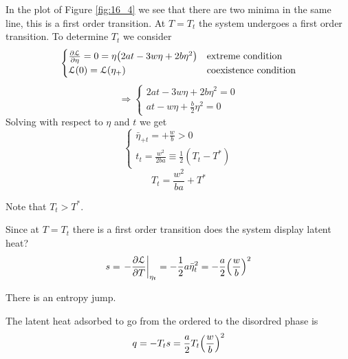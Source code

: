 \documentclass[../main/main.tex]{subfiles}
\begin{document}
\begin{itemize}
\begin{itemize}
In the plot of Figure \ref{fig:16_4} we see that there are two minima in the same line, this is  a first order transition.
At \( T=T_t \) the system undergoes a first order transition. To determine \( T_t \) we consider
\begin{equation}
  \begin{cases}
   \pdv{\mathcal{L}}{\eta } = 0 = \eta \qty(2 a t - 3 w \eta + 2 b \eta ^2)  & \text{extreme condition}\\
  \mathcal{L} ( 0 ) = \mathcal{L} ( \eta _+) & \text{coexistence condition}
  \end{cases}
\end{equation}
\begin{equation}
\Rightarrow
  \begin{cases}
   2 a t - 3 w \eta + 2 b \eta ^2 = 0\\
   a t - w \eta + \frac{b}{2} \eta ^2 = 0
  \end{cases}
\end{equation}
Solving with respect to \( \eta  \)  and \( t \) we get
\begin{equation}
  \begin{cases}
   \bar{\eta }_{+t} = + \frac{w}{b} >0 \\
    t_t = \frac{w^2}{2ba} \equiv \frac{1}{2} (T_t - T^*)
  \end{cases}
\end{equation}
\begin{equation}
  T_t = \frac{w^2}{b a} + T^*
\end{equation}
\begin{remark}
Note that \( T_t >T^* \).
\end{remark}
Since at \( T= T_t \) there is a first order transition does the system display latent heat?
\begin{equation}
  s = \eval{- \pdv{\mathcal{L}}{T} }_{\eta _t} = - \frac{1}{2} a \bar{\eta }_t^2 = - \frac{a}{2} \qty(\frac{w}{b})^2
\end{equation}
\begin{remark}
There is an entropy jump.
\end{remark}
The latent heat adsorbed to go from the ordered to the disordred phase is
\begin{equation}
  q = - T_t s = \frac{a}{2} T_t \qty(\frac{w}{b})^2
\end{equation}


\end{itemize}
\end{itemize}
\end{document}
